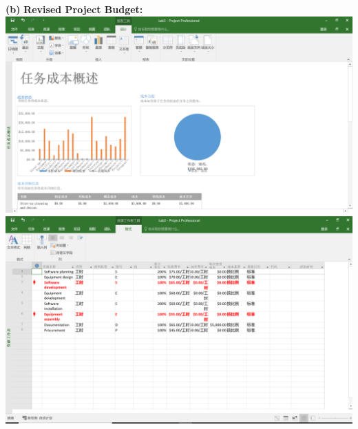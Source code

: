\documentclass[11pt]{article}
\renewcommand\part[1]{\vspace{.10in}\textbf{(#1)}}
\newcommand\correctness{\vspace{.10in}\textbf{Revised Project Budget: }}
\begin{document}
\part{b} \correctness
\includegraphics[scale=0.4]{recost.png}
\includegraphics[scale=0.4]{res.png}
\end{document}
